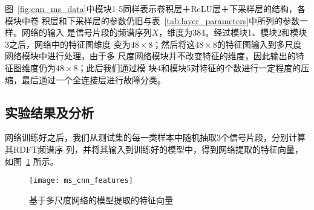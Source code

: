 图~\ref{fig:cnn_ms_data}中模块1-5同样表示卷积层＋ReLU层＋下采样层的结构，各模块中卷
积层和下采样层的参数仍旧与表~\ref{tab:layer_parameters}中所列的参数一样。网络的输入
是信号片段的频谱序列$X$，维度为384。经过模块1、模块2和模块3之后，网络中的特征图维度
变为$48\times 8$；然后将这$48\times 8$的特征图输入到多尺度网络模块中进行处理，由于多
尺度网络模块并不改变特征的维度，因此输出的特征图维度仍为$48\times 8$；此后我们通过模
块4和模块5对特征的个数进行一定程度的压缩，最后通过一个全连接层进行故障分类。

\subsection{实验结果及分析}

网络训练好之后，我们从测试集的每一类样本中随机抽取3个信号片段，分别计算其RDFT频谱序
列，并将其输入到训练好的模型中，得到网络提取的特征向量，如图~\ref{fig:ms_cnn_features}
所示。
\begin{figure}[ht]
  \centering
  \texttt{[image: ms\_cnn\_features]}
  \caption{基于多尺度网络的模型提取的特征向量}
  \label{fig:ms_cnn_features}
\end{figure}

